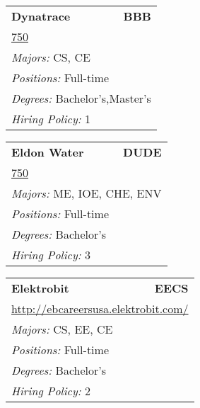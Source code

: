 \documentclass[twoside]{article}
\begin{document}
\begin{center}
\begin{multicols}{3}
\begin{FlushLeft}
\begin{minipage}{.9\columnwidth}\begin{tabularx}{.95\columnwidth}{Xr}
                 {\Large\bf Dynatrace} & {\Large\bf BBB}\\
    \multicolumn{2}{p{.95\columnwidth}}{\url{750}}\\
    \multicolumn{2}{p{.95\columnwidth}}{\emph{Majors:} CS, CE}\\
    \multicolumn{2}{p{.95\columnwidth}}{\emph{Positions:} Full-time}\\
    \multicolumn{2}{p{.95\columnwidth}}{\emph{Degrees:} Bachelor's,Master's}\\
    \multicolumn{2}{p{.95\columnwidth}}{\emph{Hiring Policy:} 1}\\
    \end{tabularx}
    
\end{minipage}
 
\begin{minipage}{.9\columnwidth}\begin{tabularx}{.95\columnwidth}{Xr}
                 {\Large\bf Eldon Water} & {\Large\bf DUDE}\\
    \multicolumn{2}{p{.95\columnwidth}}{\url{750}}\\
    \multicolumn{2}{p{.95\columnwidth}}{\emph{Majors:} ME, IOE, CHE, ENV}\\
    \multicolumn{2}{p{.95\columnwidth}}{\emph{Positions:} Full-time}\\
    \multicolumn{2}{p{.95\columnwidth}}{\emph{Degrees:} Bachelor's}\\
    \multicolumn{2}{p{.95\columnwidth}}{\emph{Hiring Policy:} 3}\\
    \end{tabularx}
    
\end{minipage}
 
\begin{minipage}{.9\columnwidth}\begin{tabularx}{.95\columnwidth}{Xr}
                 {\Large\bf Elektrobit} & {\Large\bf EECS}\\
    \multicolumn{2}{p{.95\columnwidth}}{\url{http://ebcareersusa.elektrobit.com/}}\\
    \multicolumn{2}{p{.95\columnwidth}}{\emph{Majors:} CS, EE, CE}\\
    \multicolumn{2}{p{.95\columnwidth}}{\emph{Positions:} Full-time}\\
    \multicolumn{2}{p{.95\columnwidth}}{\emph{Degrees:} Bachelor's}\\
    \multicolumn{2}{p{.95\columnwidth}}{\emph{Hiring Policy:} 2}\\
    \end{tabularx}
    

\end{minipage}
\end{FlushLeft}
\end{multicols}
\end{center}
\end{document}
